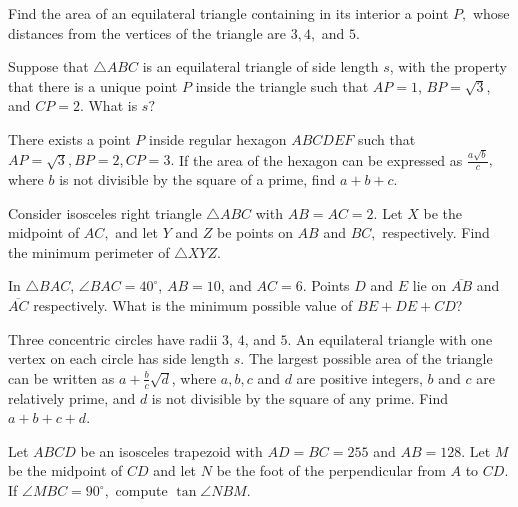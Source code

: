 \documentclass{article}
\begin{document}
    \begin{prob}[]{6}
Find the area of an equilateral triangle containing in its interior a point $P,$ whose distances from the vertices of the triangle are $3,4,$ and $5.$
\end{prob}  
    
    \begin{prob}[AMC 12A 2020/24]{6}
Suppose that $\triangle ABC$ is an equilateral triangle of side length $s$, with the property that there is a unique point $P$ inside the triangle such that $AP = 1$, $BP = \sqrt{3}$, and $CP = 2$. What is $s?$
\end{prob}
    
    \begin{prob}{6}
 There exists a point $P$ inside regular hexagon $ABCDEF$ such that $AP=\sqrt{3},BP=2,CP=3.$ If the area of the hexagon can be expressed as $\frac{a\sqrt{b}}{c},$ where $b$ is not divisible by the square of a prime, find $a+b+c.$
\end{prob}

    \begin{prob}[China]{6}
Consider isosceles right triangle $\triangle ABC$ with $AB=AC=2.$ Let $X$ be the midpoint of $AC,$ and let $Y$ and $Z$ be points on $AB$ and $BC,$ respectively. Find the minimum perimeter of $\triangle XYZ.$
\end{prob}
    
    \begin{prob}[AMC 12A 2014/20]{6}
In $\triangle BAC$, $\angle BAC=40^\circ$, $AB=10$, and $AC=6$. Points $D$ and $E$ lie on $\overline{AB}$ and $\overline{AC}$ respectively. What is the minimum possible value of $BE+DE+CD$?
\end{prob}
    
    \begin{prob}[AIME I 2012/13]{6}
 Three concentric circles have radii $3$, $4$, and $5$.  An equilateral triangle with one vertex on each circle has side length $s$.  The largest possible area of the triangle can be written as $a+\frac{b}{c}\sqrt{d}$, where $a,b,c$ and $d$ are positive integers, $b$ and $c$ are relatively prime, and $d$ is not divisible by the square of any prime.  Find $a+b+c+d$.
\end{prob}
    
    \begin{prob}[HMMT 2019]{6}
Let $ABCD$ be an isosceles trapezoid with $AD=BC= 255$ and $AB= 128.$ Let $M$ be the midpoint of $CD$ and let $N$ be the foot of the perpendicular from $A$ to $CD.$ If $\angle MBC= 90^{\circ},$ compute $\tan\angle NBM.$
\end{prob}
    
\end{document}
